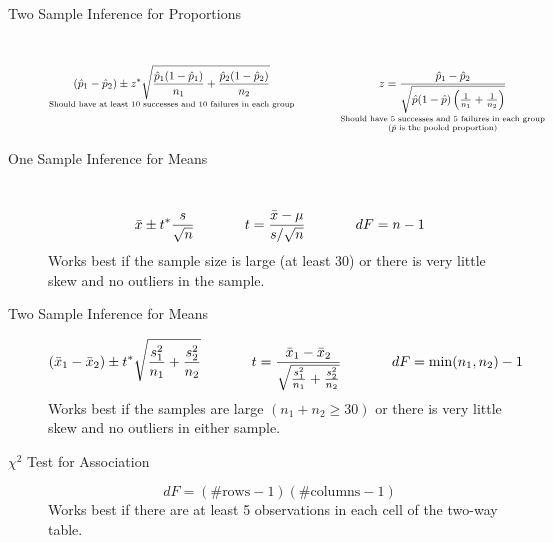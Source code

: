 \documentclass[11pt]{article}
\newcommand{\ds}{\displaystyle}
\begin{document}
\begin{description}
\item[Two Sample Inference for Proportions] ~%
\[
\underset{\text{Should have at least 10 successes and 10 failures in each group}}{\displaystyle(\hat{p}_1 - \hat{p}_2)  \pm z^* \sqrt{ \frac{\hat{p}_1(1-\hat{p}_1)}{n_1}+\frac{\hat{p}_2(1-\hat{p}_2)}{n_2} }} \hspace{0.5in} \underset{\scriptsize \begin{array}{c}\text{Should have 5 successes and 5 failures in each group} \\ (\hat{p} \text{ is the pooled proportion}) \end{array}}{ z = \frac{\hat{p}_1 - \hat{p}_2}{\sqrt{\hat{p}(1-\hat{p})\left( \frac{1}{n_1} + \frac{1}{n_2} \right)}} }
\]

\item[One Sample Inference for Means] ~
$${\bar{x} \pm t^* \frac{s}{\sqrt{n}} \hspace*{0.5in} \ds t = \frac{\bar{x} - \mu}{s/\sqrt{n}} \hspace*{0.5in} dF = n-1}$$
{\footnotesize Works best if the sample size is large (at least 30) or there is very little skew and no outliers in the sample. }

\item[Two Sample Inference for Means] 
\[
(\bar{x}_1 - \bar{x}_2) \pm t^* \sqrt{ \frac{s_1^2}{n_1} + \frac{s_2^2}{n_2} } \hspace*{0.5in} t = \frac{\bar{x}_1 - \bar{x}_2}{ \sqrt{ \frac{s_1^2}{n_1} + \frac{s_2^2}{n_2}} }  \hspace*{0.5in} dF = \min(n_1,n_2) - 1
\]
{\footnotesize Works best if the samples are large $(n_1 + n_2 \ge 30)$ or there is very little skew and no outliers in either sample. }

\item[$\chi^2$ Test for Association]
$$dF = (\#\text{rows}-1)(\#\text{columns}-1)$$
{\footnotesize Works best if there are at least 5 observations in each cell of the two-way table.}
\end{description}
\end{document}
